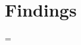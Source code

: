 
\clearpage
\chapter{Findings}

\renewcommand{\FindingNumber}{1}
\renewcommand{\ReportBoolIsFirstFindingInSection}{true}
\immediate\openout\outfileSummary=\ReportSummaryFile

\immediate\closeout\outfileSummary
